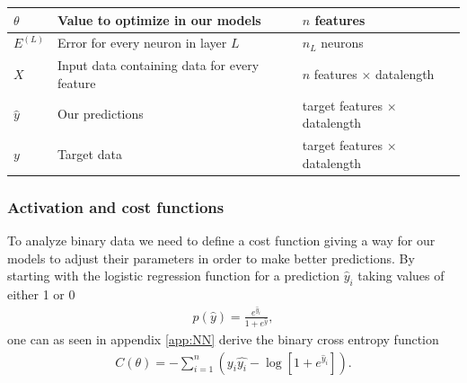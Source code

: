 \documentclass[11pt]{article}
\begin{document}
\begin{table}
\begin{small}
\begin{center}
\begin{tabular}{|l|l|l|}
                \hline
                $\theta$       & Value to optimize in our models                           & $n$ features                        \\
                \hline
                ${E}^{(L)}$    & Error for every neuron in layer $L$                       & $n_{L}$ neurons                     \\
                \hline
                $X$            & Input data containing data for every feature              & $n$ features $\times$ datalength    \\
                \hline
                $\hat{y}$      & Our predictions                                           & target features $\times$ datalength \\
                \hline
                $y$            & Target data                                               & target features $\times$ datalength \\
                \hline
            \end{tabular}
        \end{center}
    \end{small}
\end{table}

\label{sub:Implementation of methods}

\subsubsection*{Activation and cost functions}
To analyze binary data we need to define a cost function giving a way for our models to adjust their parameters in order to make better predictions. By starting with the logistic regression function for a prediction $\hat{y}_i$ taking values of either 1 or 0
\begin{align*}
    p(\hat{y}) = \frac{e^{\hat{y}_i}}{1 + e^{\hat{y}}},
\end{align*}
one can as seen in appendix \ref{app:NN} derive the binary cross entropy function
\begin{align*}
    C(\theta) = - \sum_{i=1}^n (y_i\hat{y_i} - \log[1+ e^{\hat{y}_i}]).
\end{align*}
\end{document}
